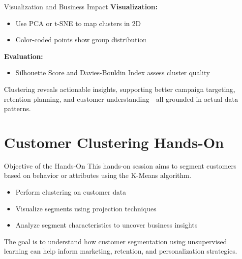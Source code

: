 \documentclass[aspectratio=169, table]{beamer}
\begin{document}
\begin{frame}{Visualization and Business Impact}
	\textbf{Visualization:}
	\begin{itemize}
		\item Use PCA or t-SNE to map clusters in 2D
		\item Color-coded points show group distribution
	\end{itemize}
	
	\textbf{Evaluation:}
	\begin{itemize}
		\item Silhouette Score and Davies-Bouldin Index assess cluster quality
	\end{itemize}
	
	Clustering reveals actionable insights, supporting better campaign targeting, retention planning, and customer understanding—all grounded in actual data patterns.
\end{frame}



\section{Customer Clustering Hands-On}

\begin{frame}{Objective of the Hands-On}
	This hands-on session aims to segment customers based on behavior or attributes using the K-Means algorithm.
	
	\begin{itemize}
		\item Perform clustering on customer data
		\item Visualize segments using projection techniques
		\item Analyze segment characteristics to uncover business insights
	\end{itemize}
	
	The goal is to understand how customer segmentation using unsupervised learning can help inform marketing, retention, and personalization strategies.
\end{frame}
\end{document}
